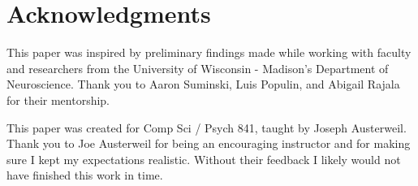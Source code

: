 \documentclass[10pt,letterpaper]{article}
\begin{document}




\section{Acknowledgments}

This paper was inspired by preliminary findings made while working with faculty and researchers from the University of Wisconsin - Madison's Department of Neuroscience. Thank you to Aaron Suminski, Luis Populin, and Abigail Rajala for their mentorship.

This paper was created for Comp Sci / Psych 841, taught by Joseph Austerweil. Thank you to Joe Austerweil for being an encouraging instructor and for making sure I kept my expectations realistic. Without their feedback I likely would not have finished this work in time.
\end{document}
